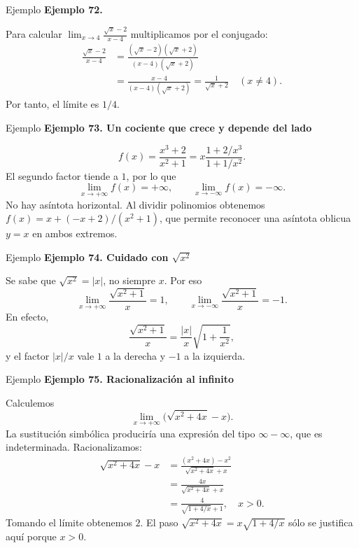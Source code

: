 \documentclass[12pt,aspectratio=169]{beamer}
\begin{document}
\begin{frame}[t,allowframebreaks]{Ejemplo}
{\color{azul}\bfseries Ejemplo 72.}\par\medskip

Para calcular $\displaystyle\lim_{x\to4}\frac{\sqrt{x}-2}{x-4}$ multiplicamos por el conjugado:
\begin{align*}
\frac{\sqrt{x}-2}{x-4}
&=\frac{(\sqrt{x}-2)(\sqrt{x}+2)}{(x-4)(\sqrt{x}+2)}\\
&=\frac{x-4}{(x-4)(\sqrt{x}+2)}
=\frac{1}{\sqrt{x}+2}\quad(x\ne4).
\end{align*}
Por tanto, el límite es $\boxed{1/4}$.
\end{frame}


\begin{frame}[t,allowframebreaks]{Ejemplo}
{\color{azul}\bfseries Ejemplo 73. Un cociente que crece y depende del lado}\par\medskip

\[
 f(x)=\frac{x^3+2}{x^2+1}=x\frac{1+2/x^3}{1+1/x^2}.
\]
El segundo factor tiende a $1$, por lo que
\[
 \lim_{x\to+\infty}f(x)=+\infty,\qquad
 \lim_{x\to-\infty}f(x)=-\infty.
\]
No hay asíntota horizontal. Al dividir polinomios obtenemos $f(x)=x+(-x+2)/(x^2+1)$, que permite reconocer una asíntota oblicua $y=x$ en ambos extremos.
\end{frame}


\begin{frame}[t,allowframebreaks]{Ejemplo}
{\color{azul}\bfseries Ejemplo 74. Cuidado con $\sqrt{x^2}$}\par\medskip

Se sabe que $\sqrt{x^2}=|x|$, no siempre $x$. Por eso
\[
 \lim_{x\to+\infty}\frac{\sqrt{x^2+1}}{x}=1,
 \qquad
 \lim_{x\to-\infty}\frac{\sqrt{x^2+1}}{x}=-1.
\]
En efecto,
\[
 \frac{\sqrt{x^2+1}}{x}
 =\frac{|x|}{x}\sqrt{1+\frac1{x^2}},
\]
y el factor $|x|/x$ vale $1$ a la derecha y $-1$ a la izquierda.
\end{frame}


\begin{frame}[t,allowframebreaks]{Ejemplo}
{\color{azul}\bfseries Ejemplo 75. Racionalización al infinito}\par\medskip

Calculemos
\[
 \lim_{x\to+\infty}\bigl(\sqrt{x^2+4x}-x\bigr).
\]
La sustitución simbólica produciría una expresión del tipo $\infty-\infty$, que es indeterminada. Racionalizamos:
\begin{align*}
\sqrt{x^2+4x}-x
 &=\frac{(x^2+4x)-x^2}{\sqrt{x^2+4x}+x}\\
 &=\frac{4x}{\sqrt{x^2+4x}+x}\\
 &=\frac4{\sqrt{1+4/x}+1},\quad x>0.
\end{align*}
Tomando el límite obtenemos $\boxed{2}$. El paso $\sqrt{x^2+4x}=x\sqrt{1+4/x}$ sólo se justifica aquí porque $x>0$.
\end{frame}
\end{document}
